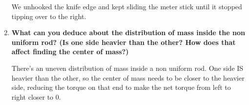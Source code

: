 \begin{enumerate}
We unhooked the knife edge and kept sliding the meter stick until it stopped tipping over to the right. 

\item \textbf{What can you deduce about the distribution of mass inside the non uniform rod? (Is one side heavier than the other? How does that affect finding the center of mass?)}

There's an uneven distribution of mass inside a non uniform rod. One side IS heavier than the other, so the center of mass needs to be closer to the heavier side, reducing the torque on that end to make the net torque from left to right closer to 0. 

\end{enumerate}


